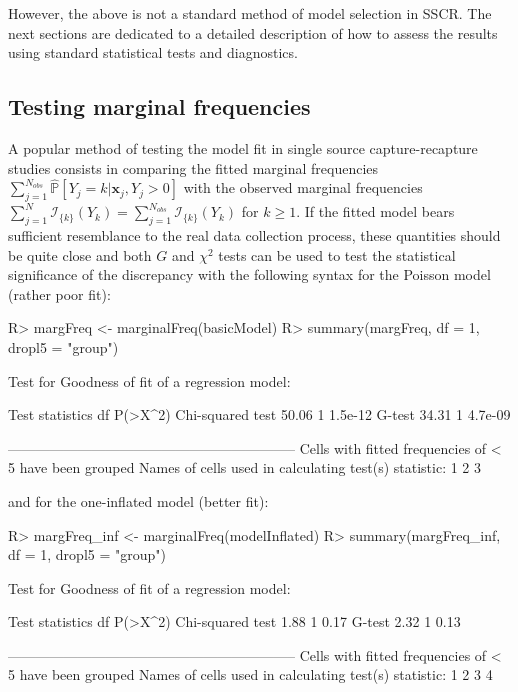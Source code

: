 \documentclass[
]{jss}
\newcommand{\1}{\mathcal{I}} \newcommand{\bZero}{\boldsymbol{0}}
\begin{document}
However, the above is not a standard method of model selection in SSCR.
The next sections are dedicated to a detailed description of how to
assess the results using standard statistical tests and diagnostics.

\subsection{Testing marginal
frequencies}\label{testing-marginal-frequencies}

A popular method of testing the model fit in single source
capture-recapture studies consists in comparing the fitted marginal
frequencies
\(\displaystyle\sum_{j=1}^{N_{obs}}\hat{\mathbb{P}}\left[Y_{j}=k|\boldsymbol{x}_{j}, Y_{j} > 0\right]\)
with the observed marginal frequencies
\(\displaystyle\sum_{j=1}^{N}\mathcal{I}_{\{k\}}(Y_{k})=\sum_{j=1}^{N_{obs}}\mathcal{I}_{\{k\}}(Y_{k})\)
for \(k\geq1\). If the fitted model bears sufficient resemblance to the
real data collection process, these quantities should be quite close and
both \(G\) and \(\chi^{2}\) tests can be used to test the statistical
significance of the discrepancy with the following 
syntax for the Poisson model (rather poor fit):

\begin{CodeChunk}
\begin{CodeInput}
R> margFreq <- marginalFreq(basicModel)
R> summary(margFreq, df = 1, dropl5 = "group")
\end{CodeInput}
\begin{CodeOutput}
Test for Goodness of fit of a regression model:

                 Test statistics df P(>X^2)
Chi-squared test           50.06  1 1.5e-12
G-test                     34.31  1 4.7e-09

-------------------------------------------------------------- 
Cells with fitted frequencies of < 5 have been grouped 
Names of cells used in calculating test(s) statistic: 1 2 3  
\end{CodeOutput}
\end{CodeChunk}

and for the one-inflated model (better fit):

\begin{CodeChunk}
\begin{CodeInput}
R> margFreq_inf <- marginalFreq(modelInflated)
R> summary(margFreq_inf, df = 1, dropl5 = "group")
\end{CodeInput}
\begin{CodeOutput}
Test for Goodness of fit of a regression model:

                 Test statistics df P(>X^2)
Chi-squared test            1.88  1    0.17
G-test                      2.32  1    0.13

-------------------------------------------------------------- 
Cells with fitted frequencies of < 5 have been grouped 
Names of cells used in calculating test(s) statistic: 1 2 3 4  
\end{CodeOutput}
\end{CodeChunk}
\end{document}
